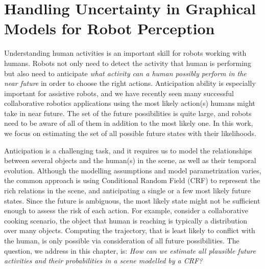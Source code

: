 

\section{Handling Uncertainty in Graphical Models for Robot Perception}
\label{intro}
Understanding  human activities is an important skill for robots working with humans. Robots not only need to detect the activity that human is performing but also need to anticipate \emph{what activity can a human possibly perform in the near future} in order to choose the right actions. Anticipation ability is especially important for assistive robots, and we have recently seen many successful collaborative robotics applications \cite{collob1,collob2,hemaISER} using the most likely action(s) humans might take in near future.
The set of the future possibilities is quite large, and robots need to be aware of all of them in addition to the most likely one. In this work, we focus on estimating the set of all possible future states with their likelihoods.


Anticipation is a challenging task, and it requires us to model the relationships between several objects and the human(s) in the scene, as well as their temporal evolution. Although the modelling assumptions and model parametrization varies, the common approach \cite{hemaAnt,gpcrf,hemaECCV,tian} is using Conditional Random Field (CRF) to represent the rich relations in the scene, and anticipating a single or a few most likely future states. Since the future is ambiguous, the most likely state might not be sufficient enough to assess the risk of each action. For example, consider a collaborative cooking scenario, the object that human is reaching is typically a distribution over many objects. Computing the trajectory, that is least likely to conflict with the human, is only possible via consideration of all future possibilities. The question, we address in this chapter, is: \emph{How can we estimate all plausible future activities and their probabilities in a scene modelled by a CRF?}



